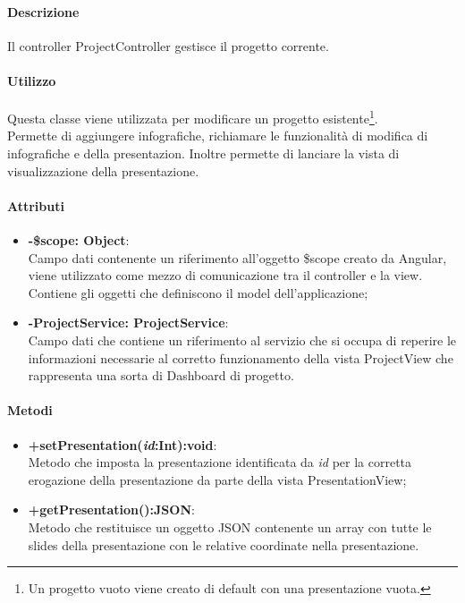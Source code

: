 	\paragraph{Descrizione}
	Il controller ProjectController gestisce il progetto corrente.
	
	\paragraph{Utilizzo}
	Questa classe viene utilizzata per modificare un progetto esistente\footnote{Un progetto vuoto viene creato di default con una presentazione vuota.}.\\
	Permette di aggiungere infografiche, richiamare le funzionalità di modifica di infografiche e della presentazion. Inoltre permette di lanciare la vista di visualizzazione della presentazione.
	\paragraph{Attributi}
	\begin{itemize}
		\item \textbf{-\$scope: Object}:\\
			Campo dati contenente un riferimento all'oggetto \$scope creato da Angular, viene utilizzato come mezzo di comunicazione tra il controller e la view. Contiene gli oggetti che definiscono il model dell'applicazione;
		\item \textbf{-ProjectService: ProjectService}:\\
			Campo dati che contiene un riferimento al servizio che si occupa di reperire le informazioni necessarie al corretto funzionamento della vista ProjectView che rappresenta una sorta di Dashboard di progetto.
	\end{itemize}
	
	\paragraph{Metodi}
	\begin{itemize}
	  \item \textbf{+setPresentation(\textit{id}:Int):void}:\\
		  Metodo che imposta la presentazione identificata da  \textit{id} per la corretta erogazione della presentazione da parte della vista PresentationView;
	  \item \textbf{+getPresentation():JSON}:\\
		  Metodo che restituisce un oggetto JSON contenente un array con tutte le slides della presentazione con le relative coordinate nella presentazione.
		  
	\end{itemize}
